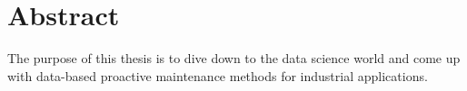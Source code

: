\chapter*{Abstract}

The purpose of this thesis is to dive down to the data science world and come up with data-based proactive maintenance methods for industrial applications.
